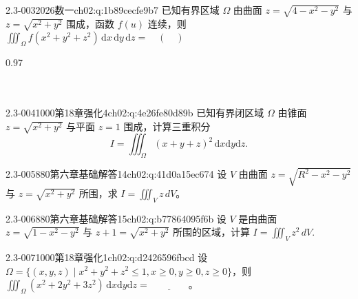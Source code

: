\begin{q}{2.3-003}{2026数一}{ch02:q:1b89cecfe9b7}
已知有界区域 $\Omega$ 由曲面 $z=\sqrt{4-x^2-y^2}$ 与 $z=\sqrt{x^2+y^2}$ 围成，函数 $f(u)$ 连续，则
$\displaystyle \iiint_{\Omega} f(x^2+y^2+z^2)\,\mathrm{d}x\,\mathrm{d}y\,\mathrm{d}z = \quad (\quad)$
\begin{opts}{0.97}
\\[0.3ex]
\\[0.3ex]
\\[0.3ex]
\end{opts}
\end{q}

\begin{q}{2.3-004}{1000第18章强化4}{ch02:q:4e26fe80d89b}
已知有界闭区域 $\Omega$ 由锥面 $z=\sqrt{x^2+y^2}$ 与平面 $z=1$ 围成，计算三重积分
\[
I=\iiint_{\Omega}(x+y+z)^2\,\mathrm{d}x\mathrm{d}y\mathrm{d}z.
\]
\end{q}

\begin{q}{2.3-005}{880第六章基础解答14}{ch02:q:41d0a15ec674}
设 $V$ 由曲面 $z=\sqrt{R^2-x^2-y^2}$ 与 $z=\sqrt{x^2+y^2}$ 所围，求 $\displaystyle I=\iiint_V z\,dV$。
\end{q}

\begin{q}{2.3-006}{880第六章基础解答15}{ch02:q:b77864095f6b}
设 $V$ 是由曲面 $z=\sqrt{1-x^{2}-y^{2}}$ 与 $z+1=\sqrt{x^{2}+y^{2}}$ 所围的区域，计算 $\displaystyle I=\iiint_{V} z^{2}\,dV$.
\end{q}

\begin{q}{2.3-007}{1000第18章强化1}{ch02:q:d2426596fbcd}
设 $\Omega=\{(x,y,z)\mid x^2+y^2+z^2\leqslant 1,x\geqslant 0,y\geqslant 0,z\geqslant 0\}$，则 $\displaystyle \iiint_{\Omega}(x^2+2y^2+3z^2)\,\mathrm{d}x\mathrm{d}y\mathrm{d}z=\underline{\hspace{4em}}$。
\end{q}

